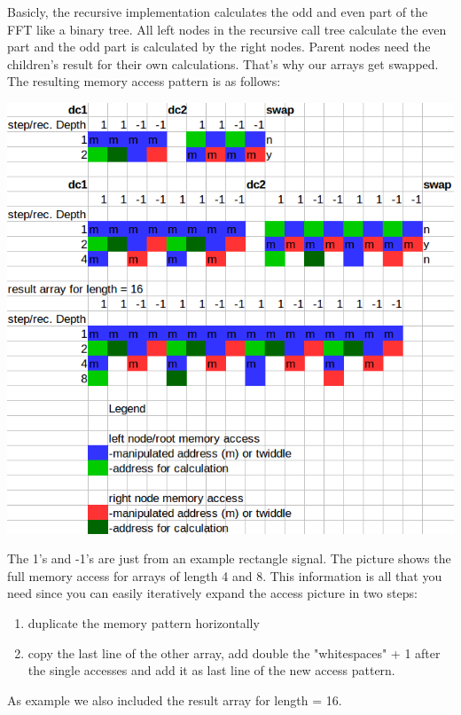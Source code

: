 Basicly, the recursive implementation calculates the odd and even part of the FFT like a binary tree. All left nodes in the recursive call tree calculate the even part and the odd part is calculated by the right nodes. Parent nodes need the children's result for their own calculations. That's why our arrays get swapped. 
The resulting memory access pattern is as follows:
\begin{center}
\includegraphics[width=\textwidth]{memacc.png}
\end{center}
The 1's and -1's are just from an example rectangle signal. The picture shows the full memory access for arrays of length 4 and 8. This information is all that you need since you can easily iteratively expand the access picture in two steps:
\begin{enumerate}
\item duplicate the memory pattern horizontally
\item copy the last line of the other array, add double the "whitespaces" + 1 after the single accesses and add it as last line of the new access pattern. 
\end{enumerate}
As example we also included the result array for length = 16.
